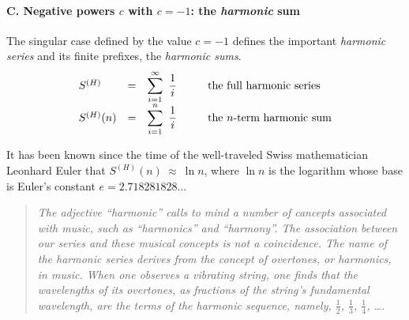 \paragraph{\small\sf C. Negative powers $c$ with $c = -1$: the {\em harmonic} sum}

The singular case defined by the value $c = -1$ defines the important
{\it harmonic series} and its finite prefixes, the {\it harmonic sums}.
\begin{equation}
\label{eq:harmonic}
\begin{array}{lcll}
S^{(H)} & = & {\displaystyle \sum_{i=1}^\infty \ \frac{1}{i}} & \hspace*{.25in}
  \mbox{the full harmonic series} \\
S^{(H)}(n) & = & {\displaystyle \sum_{i=1}^n \ \frac{1}{i} } & \hspace*{.25in}
  \mbox{the $n$-term harmonic sum} \\
\end{array}
\end{equation}

It has been known since the time of the well-traveled Swiss
mathematician Leonhard Euler
that $S^{(H)}(n) \ \approx \ \ln n$, where $\ln n$ is the logarithm
whose base is Euler's constant
$e = 2.718281828 \ldots$

\begin{quote}
{\em The adjective ``harmonic'' calls to mind a number of cancepts
  associated with {\em music}, such as ``harmonics'' and ``harmony''.
  The association between our series and these musical concepts is not
  a coincidence.  The name of the harmonic series derives from the
  concept of {\em overtones}, or {\em harmonics}, in music.  When one
  observes a vibrating string, one finds that the wavelengths of its
  overtones, as fractions of the string's fundamental wavelength, are
  the terms of the {\em harmonic sequence}, namely, $\frac{1}{2}$,
  $\frac{1}{3}$, $\frac{1}{4}$, \ldots.  }
\end{quote}









